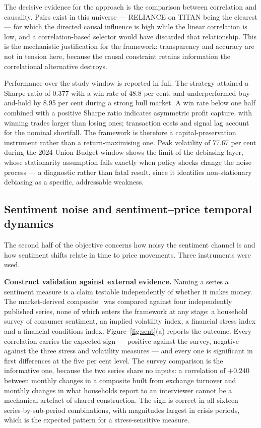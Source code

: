 The decisive evidence for the approach is the comparison between correlation and
causality. Pairs exist in this universe --- RELIANCE on TITAN being the clearest --- for
which the directed causal influence is high while the linear correlation is low, and a
correlation-based selector would have discarded that relationship. This is the mechanistic
justification for the framework: transparency and accuracy are not in tension here,
because the causal constraint retains information the correlational alternative destroys.

Performance over the study window is reported in full. The strategy attained a Sharpe
ratio of 0.377 with a win rate of 48.8 per cent, and underperformed buy-and-hold by 8.95
per cent during a strong bull market. A win rate below one half combined with a positive
Sharpe ratio indicates asymmetric profit capture, with winning trades larger than losing
ones; transaction costs and signal lag account for the nominal shortfall. The framework is
therefore a capital-preservation instrument rather than a return-maximising one. Peak
volatility of 77.67 per cent during the 2024 Union Budget window shows the limit of the
debiasing layer, whose stationarity assumption fails exactly when policy shocks change the
noise process --- a diagnostic rather than fatal result, since it identifies
non-stationary debiasing as a specific, addressable weakness.

\subsection{Sentiment noise and sentiment--price temporal dynamics}

The second half of the objective concerns how noisy the sentiment channel is and how
sentiment shifts relate in time to price movements. Three instruments were used.

\textbf{Construct validation against external evidence.} Naming a series a sentiment
measure is a claim testable independently of whether it makes money. The market-derived
composite~\cite{bakerwurgler2007} was compared against four independently published
series, none of which enters the framework at any stage: a household survey of consumer
sentiment, an implied volatility index, a financial stress index and a financial
conditions index. Figure~\ref{fig:sent}(a) reports the outcome. Every correlation carries
the expected sign --- positive against the survey, negative against the three stress and
volatility measures --- and every one is significant in first differences at the five per
cent level. The survey comparison is the informative one, because the two series share no
inputs: a correlation of $+0.240$ between monthly changes in a composite built from
exchange turnover and monthly changes in what households report to an interviewer cannot
be a mechanical artefact of shared construction. The sign is correct in all sixteen
series-by-sub-period combinations, with magnitudes largest in crisis periods, which is the
expected pattern for a stress-sensitive measure.

